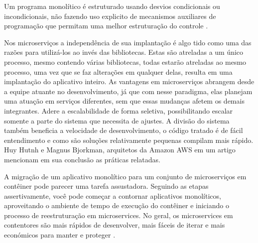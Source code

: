 Um programa monolítico é estruturado usando desvios condicionais ou incondicionais, não fazendo uso explicito de mecanismos
auxiliares de programação que permitam uma melhor estruturação do
controle \cite{teoria-da-computacao-3ed-ufrgs-maquinas-universais-e-computabilidade}.


Nos microserviços a independência de sua implantação é algo tido como uma das razões para utilizá-los ao invés das
bibliotecas. Estas são atreladas a um único processo, mesmo contendo várias bibliotecas, todas estarão atreladas ao mesmo
processo, uma vez que se faz alterações em qualquer delas, resulta em uma implantação do aplicativo inteiro.
As vantagens em microserviços abrangem desde a equipe atuante no desenvolvimento, já que com nesse paradigma, elas planejam
uma atuação em serviços diferentes, sem que essas mudanças afetem os demais integrantes. Adere a escalabilidade de forma
seletiva, possibilitando escalar somente a parte do sistema que necessita de ajustes. A divisão do sistema também beneficia
a velocidade de desenvolvimento, o código tratado é de fácil entendimento e como são soluções relativamente pequenas
compilam mais rápido. Huy Hutnh e Magnus Bjorkman, arquitetos da Amazon AWS em um artigo mencionam em sua conclusão as práticas relatadas.

\begin{citacao}
A migração de um aplicativo monolítico para um conjunto de microserviços em contêiner pode parecer uma tarefa assustadora.
Seguindo as etapas assertivamente, você pode começar a contornar aplicativos monolíticos, aproveitando o ambiente de tempo
de execução do contêiner e iniciando o processo de reestruturação em microservices. No geral, os microservices em
contentores são mais rápidos de desenvolver, mais fáceis de iterar e mais económicos para manter e
proteger \cite{deploying-java-microservices-on-amazon-ec2-container-service}.
\end{citacao}
